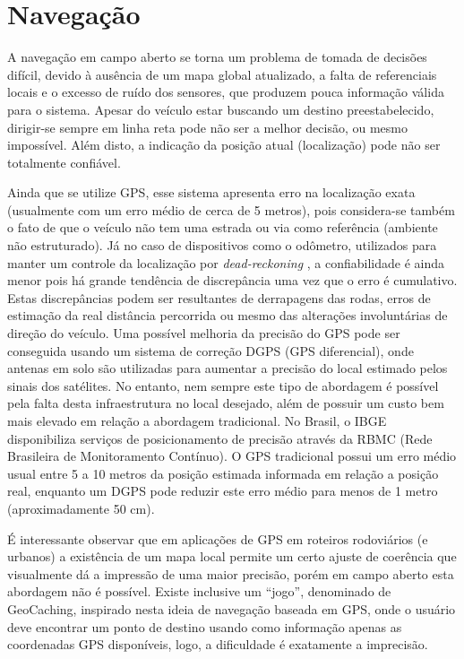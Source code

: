 \section{Navegação}
\label{sec:navegacao}

A navegação em campo aberto se torna um problema de tomada de decisões difícil,
devido à ausência de um mapa global atualizado, a falta de referenciais locais e
o excesso de ruído dos sensores, que produzem pouca informação válida para o
sistema. Apesar do veículo estar buscando um destino preestabelecido, dirigir-se
sempre em linha reta pode não ser a melhor decisão, ou mesmo impossível. Além
disto, a indicação da posição atual (localização) pode não ser totalmente
confiável.

Ainda que se utilize GPS, esse sistema apresenta erro na localização exata
(usualmente com um erro médio de cerca de 5
metros),
pois considera-se também o fato de que o veículo não tem uma estrada ou via como
referência (ambiente não estruturado). Já no caso de dispositivos como o
odômetro, utilizados para manter um controle da localização por
\textit{dead-reckoning} \cite{Dudekbook}, a confiabilidade é ainda menor pois
há grande tendência de discrepância uma vez que o erro é cumulativo. Estas
discrepâncias podem ser resultantes de derrapagens das rodas, erros de estimação
da real distância percorrida ou mesmo das alterações involuntárias de direção do
veículo. Uma possível melhoria da precisão do GPS pode ser conseguida usando um
sistema de correção DGPS (GPS diferencial), onde antenas em solo são utilizadas
para aumentar a precisão do local estimado pelos sinais dos satélites. No
entanto, nem sempre este tipo de abordagem é possível pela falta desta
infraestrutura no local desejado, além de possuir um custo bem mais elevado em
relação a abordagem tradicional. No Brasil, o IBGE disponibiliza serviços de posicionamento de precisão
através da RBMC (Rede
Brasileira de Monitoramento Contínuo). O GPS tradicional possui um erro médio
usual entre 5 a 10 metros da posição estimada informada em relação a posição
real, enquanto um DGPS pode reduzir este erro médio para menos de 1 metro
(aproximadamente 50 cm).

É interessante observar que em aplicações de GPS em roteiros rodoviários (e
urbanos) a existência de um mapa local permite um certo ajuste de coerência que
visualmente dá a impressão de uma maior precisão, porém em campo aberto esta
abordagem não é possível. Existe inclusive um “jogo”, denominado de
GeoCaching, inspirado nesta ideia de
navegação baseada em GPS, onde o usuário deve encontrar um ponto de destino
usando como informação apenas as coordenadas GPS disponíveis, logo, a
dificuldade é exatamente a imprecisão. 

